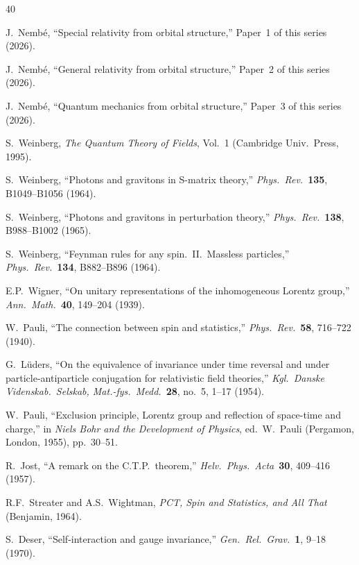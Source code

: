 \documentclass[12pt]{article}
\theoremstyle{plain}
\theoremstyle{definition}
\theoremstyle{remark}
\begin{document}
\begin{thebibliography}{40}

 J.~Nemb\'e, ``Special relativity from orbital structure,'' Paper~1 of this series (2026).

 J.~Nemb\'e, ``General relativity from orbital structure,'' Paper~2 of this series (2026).

 J.~Nemb\'e, ``Quantum mechanics from orbital structure,'' Paper~3 of this series (2026).

 S.~Weinberg, \emph{The Quantum Theory of Fields}, Vol.~1 (Cambridge Univ.\ Press, 1995).

 S.~Weinberg, ``Photons and gravitons in S-matrix theory,'' \emph{Phys.\ Rev.}\ \textbf{135}, B1049--B1056 (1964).

 S.~Weinberg, ``Photons and gravitons in perturbation theory,'' \emph{Phys.\ Rev.}\ \textbf{138}, B988--B1002 (1965).

 S.~Weinberg, ``Feynman rules for any spin.\ II.\ Massless particles,'' \emph{Phys.\ Rev.}\ \textbf{134}, B882--B896 (1964).

 E.P.~Wigner, ``On unitary representations of the inhomogeneous Lorentz group,'' \emph{Ann.\ Math.}\ \textbf{40}, 149--204 (1939).

 W.~Pauli, ``The connection between spin and statistics,'' \emph{Phys.\ Rev.}\ \textbf{58}, 716--722 (1940).

 G.~L\"uders, ``On the equivalence of invariance under time reversal and under particle-antiparticle conjugation for relativistic field theories,'' \emph{Kgl.\ Danske Videnskab.\ Selskab, Mat.-fys.\ Medd.}\ \textbf{28}, no.~5, 1--17 (1954).

 W.~Pauli, ``Exclusion principle, Lorentz group and reflection of space-time and charge,'' in \emph{Niels Bohr and the Development of Physics}, ed.\ W.~Pauli (Pergamon, London, 1955), pp.~30--51.

 R.~Jost, ``A remark on the C.T.P.\ theorem,'' \emph{Helv.\ Phys.\ Acta}\ \textbf{30}, 409--416 (1957).

 R.F.~Streater and A.S.~Wightman, \emph{PCT, Spin and Statistics, and All That} (Benjamin, 1964).

 S.~Deser, ``Self-interaction and gauge invariance,'' \emph{Gen.\ Rel.\ Grav.}\ \textbf{1}, 9--18 (1970).


\end{thebibliography}
\end{document}
